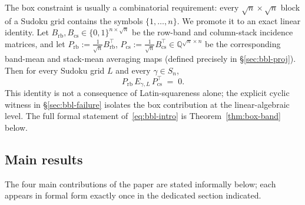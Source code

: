 \documentclass[11pt,a4paper]{article}
\theoremstyle{definition}
\theoremstyle{remark}
\providecommand{\Q}{\mathbb{Q}}
\newcommand{\Egamma}{E_{\gamma,L}}
\newcommand{\Prb}{P_{\mathrm{rb}}}
\newcommand{\Pcs}{P_{\mathrm{cs}}}
\begin{document}
The box constraint is usually a combinatorial requirement: every
$\sqrt{n} \times \sqrt{n}$ block of a Sudoku grid contains the symbols
$\{1, \dots, n\}$. We promote it to an exact linear identity. Let
$B_{\mathrm{rb}}, B_{\mathrm{cs}} \in \{0,1\}^{n \times \sqrt{n}}$ be
the row-band and column-stack incidence matrices, and let
$\Prb := \tfrac{1}{\sqrt{n}} B_{\mathrm{rb}}^{\!\top}$,
$\Pcs := \tfrac{1}{\sqrt{n}} B_{\mathrm{cs}}^{\!\top} \in
\Q^{\sqrt{n} \times n}$ be the corresponding band-mean and stack-mean
averaging maps (defined precisely in \S\ref{sec:bbl-proj}).
Then for every Sudoku grid $L$ and every $\gamma \in S_n$,
\begin{equation}\label{eq:bbl-intro}
   \Prb \, \Egamma \, \Pcs^{\!\top} \;=\; 0.
\end{equation}
This identity is not a consequence of Latin-squareness alone; the
explicit cyclic witness in \S\ref{sec:bbl-failure} isolates the box
contribution at the linear-algebraic level. The full
formal statement of~\eqref{eq:bbl-intro} is Theorem~\ref{thm:box-band}
below.

\subsection{Main results}\label{sec:intro-main}

The four main contributions of the paper are stated informally below;
each appears in formal form exactly once in the dedicated section
indicated.
\end{document}
